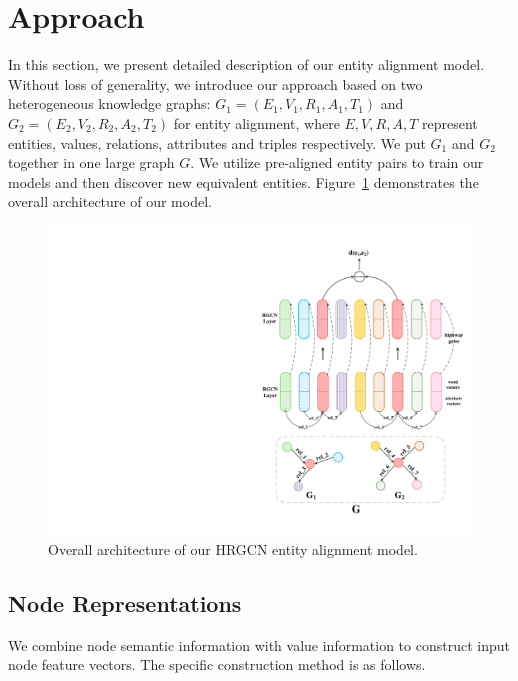 
	\section{Approach}
	\label{section:app}
	In this section, we present detailed description of our entity alignment model. Without loss of generality, we introduce our approach based on two heterogeneous knowledge graphs: $G_1 = (E_1,V_1,R_1,A_1,T_1)$ and $G_2 = (E_2,V_2,R_2,A_2,T_2)$ for entity alignment, where $E,V,R,A,T$ represent entities, values, relations, attributes and triples respectively.
	We put $G_1$ and $G_2$ together in one large graph $G$. We utilize pre-aligned entity pairs to train our models and then discover new equivalent entities. Figure~\ref{all} demonstrates the overall architecture of our model.
	
	
	\begin{figure}
		\begin{center}
			\includegraphics[width=0.8\linewidth]{figures/graph2.pdf}
			\caption{Overall architecture of our HRGCN entity alignment model.}
			\label{all}
		\end{center}
	\end{figure}
	
	\subsection{Node Representations}
	\label{subsection:Node Representations}
	We combine node semantic information with value information to construct input node feature vectors. The specific construction method is as follows.
	
